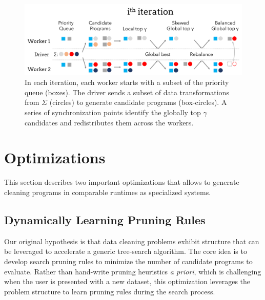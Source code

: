 \begin{figure}[t]
    \centering
    \includegraphics[width=\columnwidth]{figures/distributed.pdf}
    \caption{In each iteration, each worker starts with a subset of the priority queue (boxes).  The driver sends a subset of data transformations from $\Sigma$ (circles) to generate candidate programs (box-circles).  A series of synchronization points identify the globally top $\gamma$ candidates and redistributes them across the workers.   \label{fig:algo}}
\end{figure}

\section{Optimizations}\label{s:opts}
This section describes two important optimizations that allows \sys to generate cleaning programs in comparable runtimes as specialized systems.

\subsection{Dynamically Learning Pruning Rules}\label{s:dynlearn}
Our original hypothesis is that data cleaning problems exhibit structure that can be leveraged to accelerate a generic tree-search algorithm.   The core idea is to develop search pruning rules to minimize the number of candidate programs to evaluate.  Rather than hand-write pruning heuristics {\it a priori}, which is challenging when the user is presented with a new dataset, this optimization leverages the problem structure to learn pruning rules during the search process.



